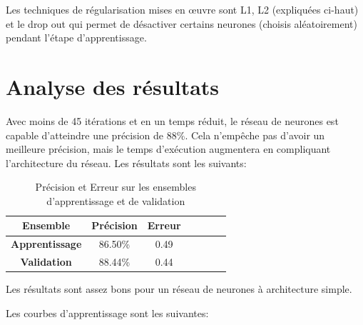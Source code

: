 \documentclass[a4paper,english,12pt]{article}
\begin{document}
Les techniques de régularisation mises en œuvre sont L1, L2 (expliquées ci-haut) et le drop out qui permet de désactiver certains neurones (choisis aléatoirement) pendant l'étape d'apprentissage.

\section{Analyse des résultats}
Avec moins de 45 itérations et en un temps réduit, le réseau de neurones est capable d'atteindre une précision de 88\%. Cela n'empêche pas d'avoir un meilleure précision, mais le temps d'exécution augmentera en compliquant l'architecture du réseau. Les résultats sont les suivants:

\begin{table}[H]\centering
	\begin{tabular}{ccccccc}
		\toprule \textbf{Ensemble} & \textbf{Précision} & \textbf{Erreur}\\    \midrule
		\textbf{Apprentissage} & 86.50\% & 0.49
		\\    \midrule
		\textbf{Validation} & 88.44\% & 0.44  \\   
		\bottomrule	
	\end{tabular}
	\caption{Précision et Erreur sur les ensembles d'apprentissage et de validation\label{tab1}}
\end{table}

Les résultats sont assez bons pour un réseau de neurones à architecture simple.

\vspace{20em}

Les courbes d'apprentissage sont les suivantes:
\end{document}
